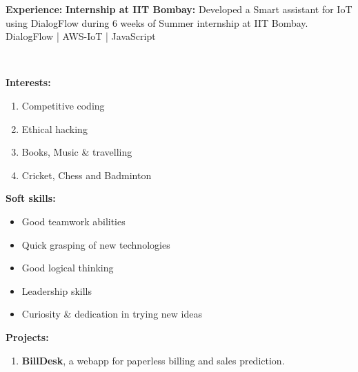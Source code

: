 \documentclass[a4paper,11pt]{article}
\begin{document}
\begin{center}
\begin{minipage}[t]{0.35\textwidth}
            \begin{LARGE}
				\textbf{Experience:}\medskip%
				{\small
					\vspace{0.2cm}
					\newline
					\textbf{Internship at IIT Bombay:}
					\newline
					Developed a Smart assistant for IoT using DialogFlow during 6 weeks of Summer internship at IIT Bombay.
					\medskip
					\\DialogFlow | AWS-IoT | JavaScript
				}
			\end{LARGE}
			\\\vspace{0.7cm}
            \begin{LARGE}
				\textbf{Interests:}\smallskip%
				{\small
					\begin{enumerate}[leftmargin=*,label=-]
						\item Competitive coding
						\item Ethical hacking
						\item Books, Music \& travelling
						\item Cricket, Chess and Badminton
					\end{enumerate}
				}
			\end{LARGE}
			\vspace{0.55cm}
			\begin{LARGE}
				\textbf{Soft skills:}\smallskip%
				{\small
					\begin{itemize}[leftmargin=*]
						\item Good teamwork abilities
						\item Quick grasping of new technologies
						\item Good logical thinking
						\item Leadership skills
						\item Curiosity \& dedication in trying new ideas
					\end{itemize}
				}
			\end{LARGE}
		\end{minipage}%
		\hspace{0.6cm}
		\begin{minipage}[t]{0.6\textwidth}
			\raggedright\smallskip
			\begin{LARGE}
				\textbf{Projects:}\medskip%
				{\small
					\begin{enumerate}
						\item \textbf{BillDesk}, a webapp for paperless billing and sales prediction.\linebreak

\end{enumerate}}
\end{LARGE}
\end{minipage}
\end{center}
\end{document}
